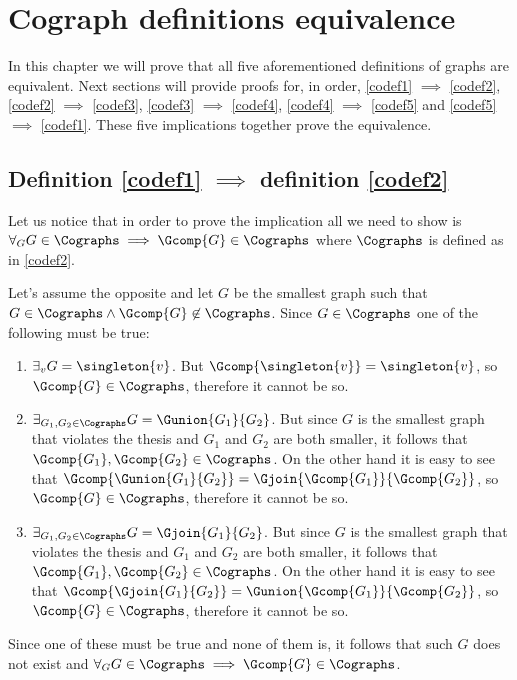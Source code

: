 
\chapter{Cograph definitions equivalence}\label{r:codefeq}

In this chapter we will prove that all five aforementioned definitions of graphs are equivalent. Next sections will provide proofs for, in order, \ref{codef1} $\implies$ \ref{codef2}, \ref{codef2} $\implies$ \ref{codef3}, \ref{codef3} $\implies$ \ref{codef4}, \ref{codef4} $\implies$ \ref{codef5} and \ref{codef5} $\implies$ \ref{codef1}. These five implications together prove the equivalence.

\section{Definition \ref{codef1} $\implies$ definition \ref{codef2}}

Let us notice that in order to prove the implication all we need to show is $\forall_G G \in \Cographs \implies \Gcomp{G} \in \Cographs$ where $\Cographs$ is defined as in \ref{codef2}.

Let's assume the opposite and let $G$ be the smallest graph such that $G \in \Cographs \land \Gcomp{G} \not\in \Cographs$. Since $G \in \Cographs$ one of the following must be true:
\begin{enumerate}
    \item $\exists_v G = \singleton{v}$. But $\Gcomp{\singleton{v}} = \singleton{v}$, so $\Gcomp{G} \in \Cographs$, therefore it cannot be so.
    \item $\exists_{G_1, G_2 \in \Cographs} G = \Gunion{G_1}{G_2}$. But since $G$ is the smallest graph that violates the thesis and $G_1$ and $G_2$ are both smaller, it follows that $\Gcomp{G_1}, \Gcomp{G_2} \in \Cographs$. On the other hand it is easy to see that $\Gcomp{\Gunion{G_1}{G_2}} = \Gjoin{\Gcomp{G_1}}{\Gcomp{G_2}}$, so $\Gcomp{G} \in \Cographs$, therefore it cannot be so.
    \item $\exists_{G_1, G_2 \in \Cographs} G = \Gjoin{G_1}{G_2}$. But since $G$ is the smallest graph that violates the thesis and $G_1$ and $G_2$ are both smaller, it follows that $\Gcomp{G_1}, \Gcomp{G_2} \in \Cographs$. On the other hand it is easy to see that $\Gcomp{\Gjoin{G_1}{G_2}} = \Gunion{\Gcomp{G_1}}{\Gcomp{G_2}}$, so $\Gcomp{G} \in \Cographs$, therefore it cannot be so.
\end{enumerate}
Since one of these must be true and none of them is, it follows that such $G$ does not exist and $\forall_G G \in \Cographs \implies \Gcomp{G} \in \Cographs$.

